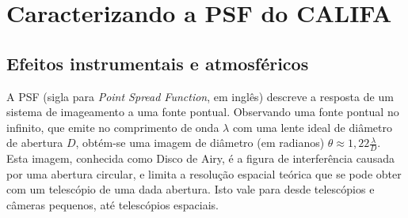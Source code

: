 


\chapter{Caracterizando a PSF do CALIFA}
\label{sec:psf}

\section{Efeitos instrumentais e atmosféricos}
\label{sec:psf:teoria}

A PSF (sigla para {\em Point Spread Function}, em inglês) descreve a resposta de
um sistema de imageamento a uma fonte pontual. Observando uma fonte pontual no
infinito, que emite no comprimento de onda $\lambda$ com uma lente ideal de
diâmetro de abertura $D$, obtém-se uma imagem de diâmetro (em radianos) $\theta
\approx 1,22\frac{\lambda}{D}$. Esta imagem, conhecida como Disco de Airy, é a
figura de interferência causada por uma abertura circular, e limita a resolução
espacial teórica que se pode obter com um telescópio de uma dada abertura. Isto
vale para desde telescópios e câmeras pequenos, até telescópios espaciais.

